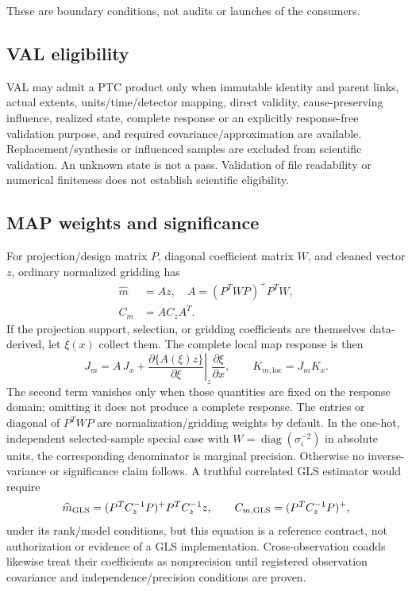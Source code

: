 \documentclass[11pt]{article}
\newcommand{\diag}{\operatorname{diag}}
\begin{document}
These are boundary conditions, not audits or launches of the consumers.

\subsection{VAL eligibility}

VAL may admit a PTC product only when immutable identity and parent links,
actual extents, units/time/detector mapping, direct validity, cause-preserving
influence, realized state, complete response or an explicitly response-free
validation purpose, and required covariance/approximation are available.
Replacement/synthesis or influenced samples are excluded from scientific
validation.  An unknown state is not a pass.  Validation of file readability
or numerical finiteness does not establish scientific eligibility.

\subsection{MAP weights and significance}

For projection/design matrix $P$, diagonal coefficient matrix $W$, and
cleaned vector $z$, ordinary normalized gridding has
\begin{align}
 \widehat m &= A z,
 \quad A=(P^TWP)^{+}P^TW,
   \label{eq:map-estimator}\\
 C_m &= A C_z A^T.
   \label{eq:map-covariance}
\end{align}
If the projection support, selection, or gridding coefficients are themselves
data-derived, let $\xi(x)$ collect them.  The complete local map response is
then
\begin{equation}
 J_m=A\,J_x+
 \left.\frac{\partial\{A(\xi)z\}}{\partial\xi}\right|_{z}
 \frac{\partial\xi}{\partial x},
 \qquad K_{m,\mathrm{loc}}=J_m K_x.
 \label{eq:map-local-response}
\end{equation}
The second term vanishes only when those quantities are fixed on the response
domain; omitting it does not produce a complete response.
The entries or diagonal of $P^TWP$ are normalization/gridding weights by
default.  In the one-hot, independent selected-sample special case with
$W=\diag(\sigma_i^{-2})$ in absolute units, the corresponding denominator is
marginal precision.  Otherwise no inverse-variance or significance claim
follows.  A truthful correlated GLS estimator would require
\begin{equation}
 \widehat m_{\rm GLS}=(P^TC_z^{-1}P)^{+}P^TC_z^{-1}z,
 \qquad
 C_{m,\rm GLS}=(P^TC_z^{-1}P)^{+},
 \label{eq:gls-reference}
\end{equation}
under its rank/model conditions, but this equation is a reference contract,
not authorization or evidence of a GLS implementation.  Cross-observation
coadds likewise treat their coefficients as nonprecision until registered
observation covariance and independence/precision conditions are proven.
\end{document}
